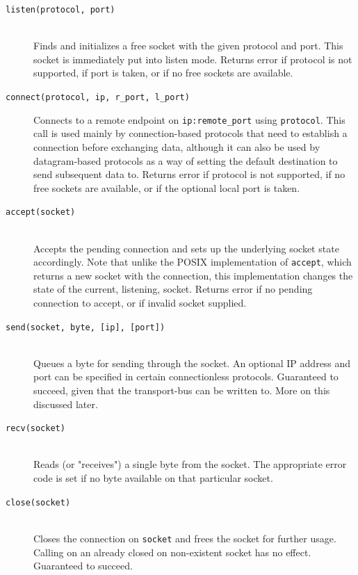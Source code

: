 \begin{description}
\item[\texttt{listen(protocol, port)}]\hfill\\
    Finds and initializes a free socket with the given protocol and port. This
    socket is immediately put into listen mode.
    Returns error if protocol is not supported, if port is taken, or if no free sockets
    are available.
\item[\texttt{connect(protocol, ip, r\_port, l\_port)}]\hfill
    Connects to a remote endpoint on \texttt{ip:remote\_port} using \texttt{protocol}.
    This call is used mainly by connection-based protocols that need to
    establish a connection before exchanging data, although it can also be used
    by datagram-based protocols as a way of setting the default destination to
    send subsequent data to.
    Returns error if protocol is not supported, if no free sockets are available,
    or if the optional local port is taken.

\item[\texttt{accept(socket)}]\hfill\\
    Accepts the pending connection and sets up the underlying socket state
    accordingly. Note that unlike the POSIX implementation of \texttt{accept},
    which returns a new socket with the connection, this implementation changes
    the state of the current, listening, socket.
    Returns error if no pending connection to accept, or if invalid socket
    supplied.

\item[\texttt{send(socket, byte, [ip], [port])}]\hfill\\
    Queues a byte for sending through the socket. An optional IP address and
    port can be specified in certain connectionless protocols.
    Guaranteed to succeed, given that the transport-bus can be written to. More
    on this discussed later. 
\item[\texttt{recv(socket)}]\hfill\\
    Reads (or "receives") a single byte from the socket. The appropriate error
    code is set if no byte available on that particular socket.

\item[\texttt{close(socket)}]\hfill\\
    Closes the connection on \texttt{socket} and frees the socket for further
    usage. Calling on an already closed on non-existent socket has no effect.
    Guaranteed to succeed.

\end{description}

